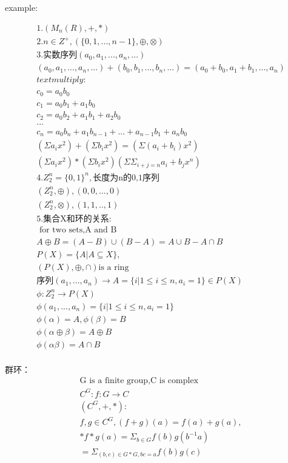 \documentclass[12pt, a4paper]{article}  %
\begin{document}
example:

\begin{align}
    &1.(M_n(R),+,*)\\
    &2.n\in Z^+,(\{0,1,...,n-1\},\oplus ,\otimes )\\
    &3.\text{实数序列}(a_0,a_1,...,a_n,...)\\
    &(a_0,a_1,...,a_n,...)+(b_0,b_1,...,b_n,...)=(a_0+b_0,a_1+b_1,...,a_n)\\
    &text{multiply:}\\
    &c_0=a_0b_0\\
    &c_1=a_0b_1+a_1b_0\\
    &c_2=a_0b_2+a_1b_1+a_2b_0\\
    &...\\
    &c_n=a_0b_n+a_1b_{n-1}+...+a_{n-1}b_1+a_nb_0\\
    &(\Sigma a_ix^2)+(\Sigma b_ix^2)=(\Sigma (a_i+b_i)x^2)\\
    &(\Sigma a_ix^2)*(\Sigma b_ix^2)(\Sigma \Sigma _{i+j=n} a_i+b_j x^n)\\
    &4.Z_2^n=\{0,1\}^n,\text{长度为n的0,1序列}\\
    & (Z_2^n,\oplus),(0,0,...,0)\\
    &(Z_2^n,\otimes),(1,1,..,1)\\
    &5. \text{集合X和环的关系:}\\
    &\text{ for two sets,A and B}\\
    &A\oplus B=(A-B)\cup (B-A)=A\cup B-A\cap B\\
    &P(X)=\{A|A\subseteq X\},\\
    &(P(X),\oplus,\cap)\text{is a ring}\\
    &\text{序列}(a_1,...,a_n)\rightarrow A=\{i|1\leqslant i\leqslant n,a_i=1\}\in P(X)\\
    &\phi:Z_2^n\rightarrow P(X)\\
    &\phi (a_1,...,a_n)=\{i|1\leqslant i\leqslant n,a_i=1\}\\
    &\phi(\alpha)=A,\phi(\beta)=B\\
    &\phi(\alpha \oplus \beta)=A\oplus B\\
    &\phi(\alpha  \beta)=A\cap B\\
\end{align}

群环：\\
\begin{align}
    &\text{G is a finite group,C is complex}\\
    &C^G: f: G\rightarrow C\\
    &(C^G,+,*):\\
    &f,g\in C^G,(f+g)(a)=f(a)+g(a),\\
    &*f*g (a)=\Sigma_{b\in G}f(b)g(b^{-1}a)\\
    &=\Sigma _{(b,c)\in G*G,bc=a} f(b)g(c)\\
\end{align}
\end{document}
